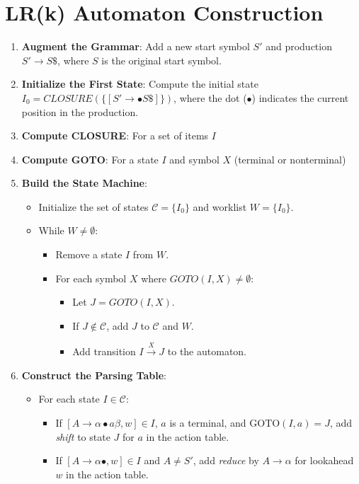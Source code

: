 \section{LR(k) Automaton Construction}

\begin{enumerate}
\item \textbf{Augment the Grammar}: Add a new start symbol $S'$ and production $S' \to S \$$, where $S$ is the original start symbol.
\item \textbf{Initialize the First State}: Compute the initial state $I_0 = CLOSURE(\{[S' \to \bullet S \$]\})$, where the dot ($\bullet$) indicates the current position in the production.
\item \textbf{Compute CLOSURE}: For a set of items $I$
\item \textbf{Compute GOTO}: For a state $I$ and symbol $X$ (terminal or nonterminal)
\item \textbf{Build the State Machine}:
   \begin{itemize}
   \item Initialize the set of states $\mathcal{C} = \{I_0\}$ and worklist $W = \{I_0\}$.
   \item While $W \neq \emptyset$:
     \begin{itemize}
     \item Remove a state $I$ from $W$.
     \item For each symbol $X$ where $GOTO(I, X) \neq \emptyset$:
       \begin{itemize}
       \item Let $J = GOTO(I, X)$.
       \item If $J \notin \mathcal{C}$, add $J$ to $\mathcal{C}$ and $W$.
       \item Add transition $I \xrightarrow{X} J$ to the automaton.
       \end{itemize}
     \end{itemize}
   \end{itemize}
   \item \textbf{Construct the Parsing Table}:
      \begin{itemize}
      \item For each state $I \in \mathcal{C}$:
        \begin{itemize}
        \item If $[A \to \alpha \bullet a \beta, w] \in I$, $a$ is a terminal, and $\text{GOTO}(I, a) = J$, add \textit{shift} to state $J$ for $a$ in the action table.
        \item If $[A \to \alpha \bullet, w] \in I$ and $A \neq S'$, add \textit{reduce} by $A \to \alpha$ for lookahead $w$ in the action table.

\end{itemize}
\end{itemize}
\end{enumerate}
